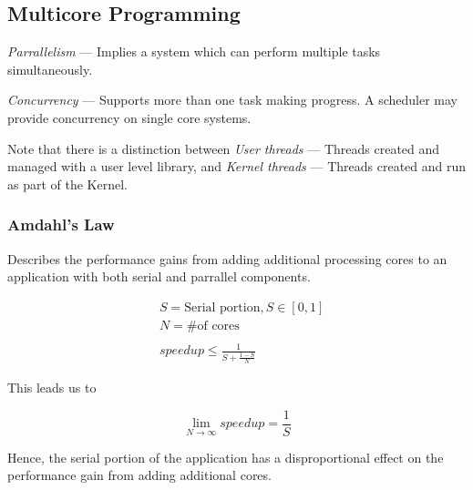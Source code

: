 \subsection{Multicore Programming}

\textit{Parrallelism} --- Implies a system which can perform multiple tasks simultaneously.

\textit{Concurrency} --- Supports more than one task making progress. A scheduler may provide concurrency on single core systems.

Note that there is a distinction between \textit{User threads} --- Threads created and managed with a
user level library, and \textit{Kernel threads} --- Threads created and run as part of the Kernel.
\subsubsection{Amdahl's Law}

Describes the performance gains from adding additional processing cores
to an application with both serial and parrallel components.

\begin{equation}
    \begin{split}
        &S = \textrm{Serial portion},S\in[0, 1] \\
        &N=\textrm{\# of cores} \\
        \\
        &speedup\leq\frac{1}{S+\frac{1-S}{N}}
    \end{split}
\end{equation}

This leads us to

\begin{equation}
    \lim_{N\to\infty}speedup = \frac{1}{S}
\end{equation}

Hence, the serial portion of the application has a disproportional effect
on the performance gain from adding additional cores.
